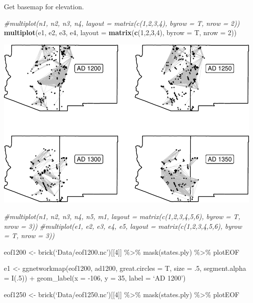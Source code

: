 \documentclass[]{article}
\newenvironment{Shaded}{\begin{snugshade}}{\end{snugshade}}
\newcommand{\KeywordTok}[1]{\textcolor[rgb]{0.13,0.29,0.53}{\textbf{{#1}}}}
\newcommand{\DataTypeTok}[1]{\textcolor[rgb]{0.13,0.29,0.53}{{#1}}}
\newcommand{\DecValTok}[1]{\textcolor[rgb]{0.00,0.00,0.81}{{#1}}}
\newcommand{\CommentTok}[1]{\textcolor[rgb]{0.56,0.35,0.01}{\textit{{#1}}}}
\newcommand{\NormalTok}[1]{{#1}}
\begin{document}
Get basemap for elevation.

\begin{Shaded}
\begin{Highlighting}[]
\CommentTok{#multiplot(n1, n2, n3, n4, layout = matrix(c(1,2,3,4), byrow = T, nrow = 2))}
\KeywordTok{multiplot}\NormalTok{(e1, e2, e3, e4, }\DataTypeTok{layout =} \KeywordTok{matrix}\NormalTok{(}\KeywordTok{c}\NormalTok{(}\DecValTok{1}\NormalTok{,}\DecValTok{2}\NormalTok{,}\DecValTok{3}\NormalTok{,}\DecValTok{4}\NormalTok{), }\DataTypeTok{byrow =} \NormalTok{T, }\DataTypeTok{nrow =} \DecValTok{2}\NormalTok{))}
\end{Highlighting}
\end{Shaded}

\includegraphics{network_files/figure-latex/unnamed-chunk-10-1.pdf}

\begin{Shaded}
\begin{Highlighting}[]
\CommentTok{#multiplot(n1, n2, n3, n4, n5, m1, layout = matrix(c(1,2,3,4,5,6), byrow = T, nrow = 3))}
\CommentTok{#multiplot(e1, e2, e3, e4, e5, layout = matrix(c(1,2,3,4,5,6), byrow = T, nrow = 3))}
\end{Highlighting}
\end{Shaded}

eof1200 \textless{}- brick(`Data/eof1200.nc'){[}{[}4{]}{]}
\%\textgreater{}\% mask(states.ply) \%\textgreater{}\% plotEOF

e1 \textless{}- ggnetworkmap(eof1200, ad1200, great.circles = T, size =
.5, segment.alpha = I(.5)) + geom\_label(x = -106, y = 35, label = `AD
1200')

eof1250 \textless{}- brick(`Data/eof1250.nc'){[}{[}4{]}{]}
\%\textgreater{}\% mask(states.ply) \%\textgreater{}\% plotEOF
\end{document}
